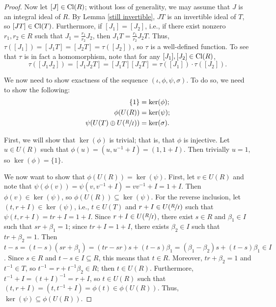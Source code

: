 \documentclass[12pt]{amsart}
\theoremstyle{definition}
\newcommand{\Cl}{\textup{Cl}}
\begin{document}
\begin{proof}
    Now let $[J]\in \Cl(R)$; without loss of generality, we may assume that $J$ is an integral ideal of $R$. By Lemma \ref{still invertible}, $JT$ is an invertible ideal of $T$, so $[JT]\in \Cl(T)$. Furthermore, if $[J_1]=[J_2]$, i.e., if there exist nonzero $r_1,r_2\in R$ such that $J_1=\frac{r_1}{r_2}J_2$, then $J_1T=\frac{r_1}{r_2}J_2T$. Thus, $\tau([J_1])=[J_1T]=[J_2T]=\tau([J_2])$, so $\tau$ is a well-defined function. To see that $\tau$ is in fact a homomorphism, note that for any $[J_1],[J_2]\in\Cl(R)$, $$\tau([J_1J_2])=[J_1J_2T]=[J_1T][J_2T]=\tau([J_1])\cdot\tau([J_2]).$$

    We now need to show exactness of the sequence $(\iota,\phi,\psi,\sigma)$. To do so, we need to show the following:
    \begin{align*}
        \{1\}&=\ker(\phi);\\
        \phi(U(R))&=\ker(\psi);\\
        \psi(U(T)\oplus U(\sfrac{R}{I}))&=\ker(\sigma).
    \end{align*}

    First, we will show that $\ker(\phi)$ is trivial; that is, that $\phi$ is injective. Let $u\in U(R)$ such that $\phi(u)=(u,u^{-1}+I)=(1,1+I)$. Then trivially $u=1$, so $\ker(\phi)=\{1\}$.

    We now want to show that $\phi(U(R))=\ker(\psi)$. First, let $v\in U(R)$ and note that $\psi(\phi(v))=\psi(v,v^{-1}+I)=vv^{-1}+I=1+I$. Then $\phi(v)\in \ker(\psi)$, so $\phi(U(R))\subseteq\ker(\psi)$. For the reverse inclusion, let $(t,r+I)\in \ker(\psi)$, i.e., $t\in U(T)$ and $r+I\in U(\sfrac{R}{I})$ such that $\psi(t,r+I)=tr+I=1+I$. Since $r+I\in U(\sfrac{R}{I})$, there exist $s\in R$ and $\beta_1\in I$ such that $sr+\beta_1=1$; since $tr+I=1+I$, there exists $\beta_2\in I$ such that $tr+\beta_2=1$. Then $t-s=(t-s)(sr+\beta_1)=(tr-sr)s+(t-s)\beta_1=(\beta_1-\beta_2)s+(t-s)\beta_1\in I$. Since $s\in R$ and $t-s\in I\subseteq R$, this means that $t\in R$. Moreover, $tr+\beta_2=1$ and $t^{-1}\in T$, so $t^{-1}=r+t^{-1}\beta_2\in R$; then $t\in U(R)$. Furthermore, $t^{-1}+I=(t+I)^{-1}=r+I$, so $t\in U(R)$ such that $(t,r+I)=(t,t^{-1}+I)=\phi(t)\in \phi(U(R))$. Thus, $\ker(\psi)\subseteq \phi(U(R))$.


\end{proof}
\end{document}
